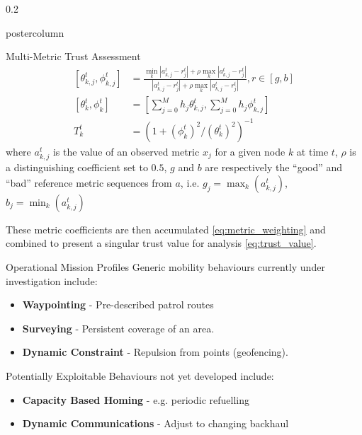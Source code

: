 \documentclass[final,hyperref={pdfpagelabels=false}]{beamer}
\def\colwidth{0.2\linewidth}
\begin{document}
\begin{frame}[fragile]
\begin{columns}[T]
\begin{column}{\colwidth}
\begin{beamercolorbox}[center,wd=\textwidth]{postercolumn}
\begin{minipage}[T]{.98\textwidth}
{\begin{block}{Multi-Metric Trust Assessment}
							\begin{align}
								\label{eq:grc}
								[\theta_{k,j}^t,\phi_{k,j}^t] & = \frac{\min_k|a_{k,j}^t - r_j^t| + \rho \max_k|a_{k,j}^t-r_j^t|}{|a_{k,j}^t-r_j^t| + \rho \max_k|a_{k,j}^t-r_j^t|},  r \in [g,b] \\
								\label{eq:metric_weighting}
								[\theta_k^t, \phi_k^t]        & = \left[\sum_{j=0}^M h_j \theta_{k,j}^t,\sum_{j=0}^M h_j \phi_{k,j}^t \right]                                                     \\
								\label{eq:trust_value}
								T_k^t                         & = ({1+{(\phi_k^t)^2}/{(\theta_k^t)^2}})^{-1}                                                                                      
							\end{align}
							where $a_{k,j}^t$ is the value of an observed metric $x_j$ for a given node $k$ at time $t$, $\rho$ is a distinguishing coefficient set to $0.5$, $g$ and $b$ are respectively the ``good'' and ``bad'' reference metric sequences from $a$, i.e. $g_j=\max_k({a_{k,j}^t})$,  $b_j=\min_k({a_{k,j}^t})$ 
							
							These metric coefficients are then accumulated \eqref{eq:metric_weighting} and combined to present a singular trust value for analysis \eqref{eq:trust_value}.
							
							
						\end{block}
						\begin{block}{Operational Mission Profiles}
							Generic mobility behaviours currently under investigation include:
							\begin{itemize}
								\item \textbf{Waypointing} - Pre-described patrol routes
								\item \textbf{Surveying} - Persistent coverage of an area.
								\item \textbf{Dynamic Constraint} - Repulsion from points (geofencing).
							\end{itemize}
														
							Potentially Exploitable Behaviours not yet developed include:
							\begin{itemize}
								\item \textbf{Capacity Based Homing} - e.g. periodic refuelling
								\item \textbf{Dynamic Communications} - Adjust to changing backhaul
							\end{itemize}
							

\end{block}}
\end{minipage}
\end{beamercolorbox}
\end{column}
\end{columns}
\end{frame}
\end{document}
